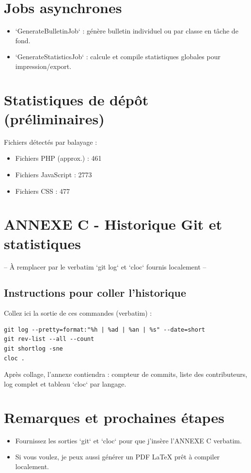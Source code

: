 \documentclass[a4paper,11pt]{article}
\begin{document}
\section{Jobs asynchrones}
\begin{itemize}
  \item `GenerateBulletinJob` : génère bulletin individuel ou par classe en tâche de fond.
  \item `GenerateStatisticsJob` : calcule et compile statistiques globales pour impression/export.
\end{itemize}

\section{Statistiques de dépôt (préliminaires)}
Fichiers détectés par balayage :
\begin{itemize}
  \item Fichiers PHP (approx.) : 461
  \item Fichiers JavaScript : 2773
  \item Fichiers CSS : 477
\end{itemize}

\section{ANNEXE C - Historique Git et statistiques}
-- À remplacer par le verbatim `git log` et `cloc` fournis localement --
\subsection*{Instructions pour coller l'historique}
Collez ici la sortie de ces commandes (verbatim) :
\begin{verbatim}
git log --pretty=format:"%h | %ad | %an | %s" --date=short
git rev-list --all --count
git shortlog -sne
cloc .
\end{verbatim}

Après collage, l'annexe contiendra : compteur de commits, liste des contributeurs, log complet et tableau `cloc` par langage.

\section{Remarques et prochaines étapes}
\begin{itemize}
  \item Fournissez les sorties `git` et `cloc` pour que j'insère l'ANNEXE C verbatim.
  \item Si vous voulez, je peux aussi générer un PDF LaTeX prêt à compiler localement.
\end{itemize}
\end{document}
